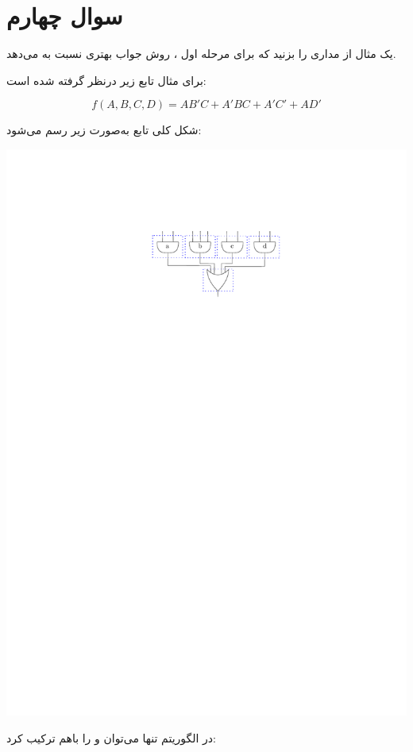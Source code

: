 \section{سوال چهارم}


یک مثال از مداری را بزنید که برای مرحله اول ، روش  جواب بهتری نسبت به  می‌دهد.


\begin{qsolve}
	برای مثال تابع زیر درنظر گرفته شده است:
	
	$$ f(A,B,C,D)=AB'C+A'BC+A'C'+AD' $$
	
	شکل کلی تابع به‌صورت زیر رسم می‌شود:
	
	\begin{center}
		\includegraphics*[width=0.6\linewidth]{pics/Q4_a.pdf}
		\label{شکل کلی مدار}
	\end{center}
	
	
	
	در الگوریتم  تنها می‌توان  و  را باهم ترکیب کرد:
	

\end{qsolve}
